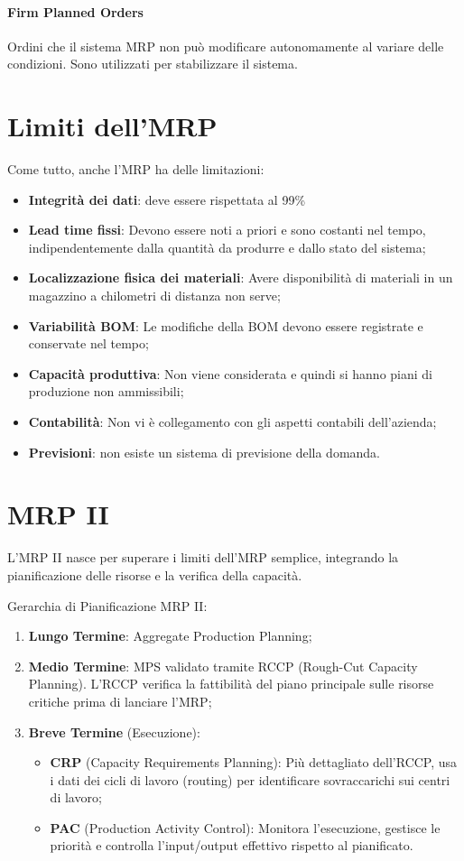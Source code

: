 \paragraph{Firm Planned Orders} Ordini che il sistema MRP non può modificare autonomamente al variare delle condizioni. Sono utilizzati per stabilizzare il sistema.

%
\section{Limiti dell'MRP}
Come tutto, anche l'MRP ha delle limitazioni:
\begin{itemize}
    \item \textbf{Integrità dei dati}: deve essere rispettata al 99\%
    \item \textbf{Lead time fissi}: Devono essere noti a priori e sono costanti nel tempo, indipendentemente dalla quantità da produrre e dallo stato del sistema;
    \item \textbf{Localizzazione fisica dei materiali}: Avere disponibilità di materiali in un magazzino a chilometri di distanza non serve;
    \item \textbf{Variabilità BOM}: Le modifiche della BOM devono essere registrate e conservate nel tempo;
    \item \textbf{Capacità produttiva}: Non viene considerata e quindi si hanno piani di produzione non ammissibili;
    \item \textbf{Contabilità}: Non vi è collegamento con gli aspetti contabili dell'azienda;
    \item \textbf{Previsioni}: non esiste un sistema di previsione della domanda.
\end{itemize}

%
\section{MRP II}
L'MRP II nasce per superare i limiti dell'MRP semplice, integrando la pianificazione delle risorse e la verifica della capacità.

Gerarchia di Pianificazione MRP II:
\begin{enumerate}
    \item \textbf{Lungo Termine}: Aggregate Production Planning;
    \item \textbf{Medio Termine}: MPS validato tramite RCCP (Rough-Cut Capacity Planning). L'RCCP verifica la fattibilità del piano principale sulle risorse critiche prima di lanciare l'MRP;
    \item \textbf{Breve Termine} (Esecuzione):
          \begin{itemize}
              \item \textbf{CRP} (Capacity Requirements Planning): Più dettagliato dell'RCCP, usa i dati dei cicli di lavoro (routing) per identificare sovraccarichi sui centri di lavoro;
              \item \textbf{PAC} (Production Activity Control): Monitora l'esecuzione, gestisce le priorità e controlla l'input/output effettivo rispetto al pianificato.
          \end{itemize}
\end{enumerate}

